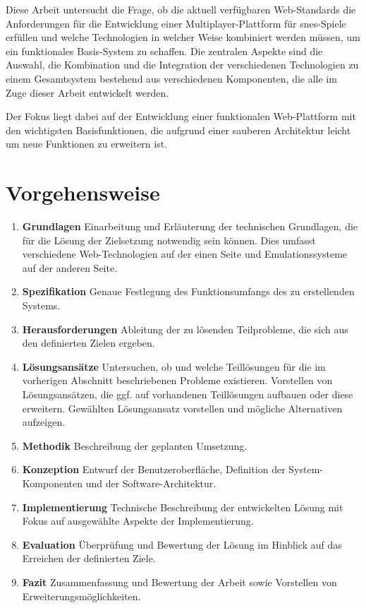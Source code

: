 Diese Arbeit untersucht die Frage, ob die aktuell verfügbaren
Web-Standards die Anforderungen für die Entwicklung einer
Multiplayer-Plattform für \gls{snes}-Spiele erfüllen und welche
Technologien in welcher Weise kombiniert werden müssen, um ein
funktionales Basis-System zu schaffen. Die zentralen Aspekte sind die
Auswahl, die Kombination und die Integration der verschiedenen
Technologien zu einem Gesamtsystem bestehend aus verschiedenen
Komponenten, die alle im Zuge dieser Arbeit entwickelt werden.

Der Fokus liegt dabei auf der Entwicklung einer funktionalen
Web-Plattform mit den wichtigsten Basisfunktionen, die aufgrund einer
sauberen Architektur leicht um neue Funktionen zu erweitern ist.

\section{Vorgehensweise}\label{vorgehensweise}

\begin{enumerate}
\def\labelenumi{\arabic{enumi}.}
\tightlist
\item
  \textbf{Grundlagen} Einarbeitung und Erläuterung der technischen
  Grundlagen, die für die Lösung der Zielsetzung notwendig sein können.
  Dies umfasst verschiedene Web-Technologien auf der einen Seite und
  Emulationssysteme auf der anderen Seite.
\item
  \textbf{Spezifikation} Genaue Festlegung des Funktionsumfangs des zu
  erstellenden Systems.
\item
  \textbf{Herausforderungen} Ableitung der zu lösenden Teilprobleme, die
  sich aus den definierten Zielen ergeben.
\item
  \textbf{Lösungsansätze} Untersuchen, ob und welche Teillösungen für
  die im vorherigen Abschnitt beschriebenen Probleme existieren.
  Vorstellen von Lösungsansätzen, die ggf. auf vorhandenen Teillösungen
  aufbauen oder diese erweitern. Gewählten Lösungsansatz vorstellen und
  mögliche Alternativen aufzeigen.
\item
  \textbf{Methodik} Beschreibung der geplanten Umsetzung.
\item
  \textbf{Konzeption} Entwurf der Benutzeroberfläche, Definition der
  System-Komponenten und der Software-Architektur.
\item
  \textbf{Implementierung} Technische Beschreibung der entwickelten
  Lösung mit Fokus auf ausgewählte Aspekte der Implementierung.
\item
  \textbf{Evaluation} Überprüfung und Bewertung der Lösung im Hinblick
  auf das Erreichen der definierten Ziele.
\item
  \textbf{Fazit} Zusammenfassung und Bewertung der Arbeit sowie
  Vorstellen von Erweiterungsmöglichkeiten.
\end{enumerate}
